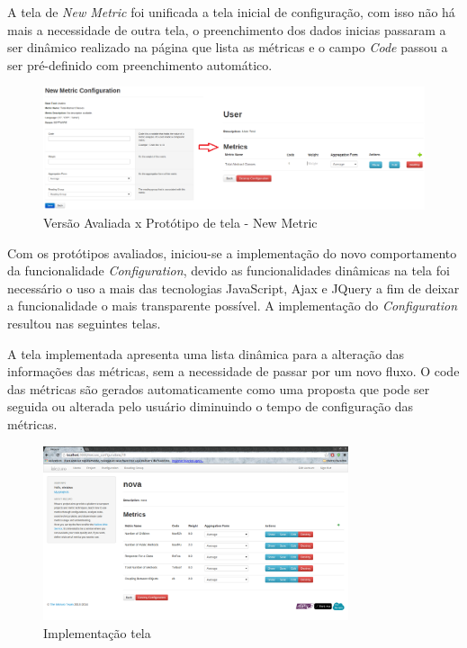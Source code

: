 A tela de \textit{New Metric} foi unificada a tela inicial de configuração, com isso não há mais a necessidade de outra tela, o preenchimento dos dados inicias passaram a ser dinâmico realizado na página que lista as métricas e o campo \textit{Code} passou a ser pré-definido com preenchimento automático. 

\graphicspath{{figuras/}}
\begin{figure}[h]
\centering
\includegraphics[width=1.0\textwidth]{PrototipoNewMetric}
\caption{Versão Avaliada x Protótipo de tela - New Metric}
\label{parallel-coordinate}
\end{figure}

Com os protótipos avaliados, iniciou-se a implementação do novo comportamento da funcionalidade \textit{Configuration}, devido as funcionalidades dinâmicas na tela foi necessário o uso a mais das tecnologias JavaScript, Ajax e JQuery a fim de deixar a funcionalidade o mais transparente possível. A implementação do \textit{Configuration} resultou nas seguintes telas.

A tela implementada apresenta uma lista dinâmica para a alteração das informações das métricas, sem a necessidade de passar por um novo fluxo. O code das métricas são gerados automaticamente como uma proposta que pode ser seguida ou alterada pelo usuário diminuindo o tempo de configuração das métricas.

\graphicspath{{figuras/}}
\begin{figure}[h]
\centering
\includegraphics[width=0.8\textwidth]{configuration}
\caption{Implementação tela}
\label{parallel-coordinate}
\end{figure}

